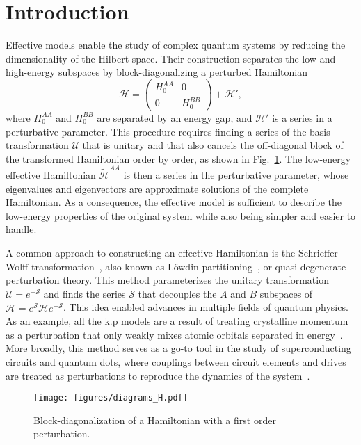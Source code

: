 \section{Introduction}

Effective models enable the study of complex quantum systems by reducing the dimensionality of the Hilbert space.
Their construction separates the low and high-energy subspaces by block-diagonalizing a perturbed Hamiltonian
%
\begin{equation}
    \mathcal{H} = \begin{pmatrix}H_0^{AA} & 0 \\ 0 & H_0^{BB}\end{pmatrix} + \mathcal{H}',
\end{equation}
%
where $H_0^{AA}$ and $H_0^{BB}$ are separated by an energy gap, and $\mathcal{H}'$ is a series in a perturbative parameter.
This procedure requires finding a series of the basis transformation $\mathcal{U}$ that is unitary and that also cancels the off-diagonal block of the transformed Hamiltonian order by order, as shown in Fig.~\ref{fig:block_diagonalization}.
The low-energy effective Hamiltonian $\tilde{\mathcal{H}}^{AA}$ is then a series in the perturbative parameter, whose eigenvalues and eigenvectors are approximate solutions of the complete Hamiltonian.
As a consequence, the effective model is sufficient to describe the low-energy properties of the original system while also being simpler and easier to handle.

A common approach to constructing an effective Hamiltonian is the Schrieffer--Wolff transformation~\cite{Schrieffer_1966,Bravyi_2011}, also known as Löwdin partitioning~\cite{Lowdin_1962}, or quasi-degenerate perturbation theory.
This method parameterizes the unitary transformation $\mathcal{U} = e^{-\mathcal{S}}$ and finds the series $\mathcal{S}$ that decouples the $A$ and $B$ subspaces of $\tilde{\mathcal{H}} = e^{\mathcal{S}}\mathcal{H}e^{-\mathcal{S}}$.
This idea enabled advances in multiple fields of quantum physics.
As an example, all the k.p models are a result of treating crystalline momentum as a perturbation that only weakly mixes atomic orbitals separated in energy~\cite{Luttinger_1955}.
More broadly, this method serves as a go-to tool in the study of superconducting circuits and quantum dots, where couplings between circuit elements and drives are treated as perturbations to reproduce the dynamics of the system~\cite{Krantz_2019,Romhanyi_2015}.
%
\begin{figure}[h!]
    \centering
    \texttt{[image: figures/diagrams\_H.pdf]}
    \caption{
      Block-diagonalization of a Hamiltonian with a first order perturbation.
    }
    \label{fig:block_diagonalization}
\end{figure}

